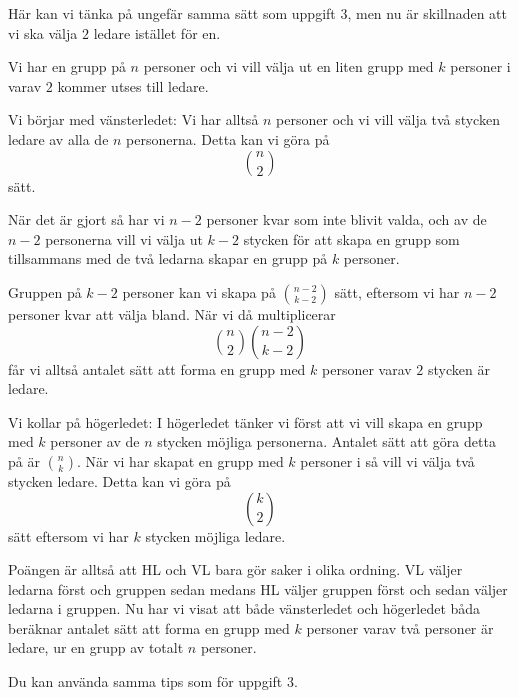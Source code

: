 \documentclass[nobib]{tufte-handout}
\begin{document}
\begin{solution}
	Här kan vi tänka på ungefär samma sätt som uppgift 3, men nu är skillnaden att vi ska välja $2$ ledare istället för en.

	Vi har en grupp på $n$ personer och vi vill välja ut en liten grupp med $k$ personer i varav $2$ kommer utses till ledare.

	Vi börjar med vänsterledet: Vi har alltså $n$ personer och vi vill välja två stycken ledare av alla de $n$ personerna. Detta kan vi göra på
	$$\binom{n}{2}$$
	sätt.
	
	När det är gjort så har vi $n-2$ personer kvar som inte blivit valda, och av de $n-2$ personerna vill vi välja ut $k-2$ stycken för att skapa en grupp som tillsammans med de två ledarna skapar en grupp på $k$ personer.
	
	Gruppen på $k-2$ personer kan vi skapa på $\binom{n-2}{k-2}$ sätt, eftersom vi har $n-2$ personer kvar att välja bland. När vi då multiplicerar
	$$\binom{n}{2}\binom{n-2}{k-2}$$
	får vi alltså antalet sätt att forma en grupp med $k$ personer varav $2$ stycken är ledare. 

	Vi kollar på högerledet: I högerledet tänker vi först att vi vill skapa en grupp med $k$ personer av de $n$ stycken möjliga personerna. Antalet sätt att göra detta på är $\binom{n}{k}$. När vi har skapat en grupp med $k$ personer i så vill vi välja två stycken ledare. Detta kan vi göra på
	$$\binom{k}{2}$$
	sätt eftersom vi har $k$ stycken möjliga ledare.  

	Poängen är alltså att HL och VL bara gör saker i olika ordning. VL väljer ledarna först och gruppen sedan medans HL väljer gruppen först och sedan väljer ledarna i gruppen. Nu har vi visat att både vänsterledet och högerledet båda beräknar antalet sätt att forma en grupp med $k$ personer varav två personer är ledare, ur en grupp av totalt $n$ personer.

	\begin{tips}
		Du kan använda samma tips som för uppgift 3.
	\end{tips}
\end{solution}
\end{document}
